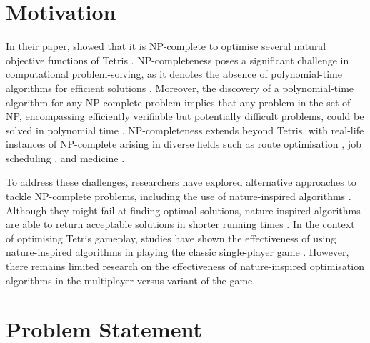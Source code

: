 \documentclass[a4paper, 12pt]{extreport}
\begin{document}
	\section{Motivation}
	
	
	In their paper, \citeauthor{tetris-is-hard-even-to-approx} showed that it is NP-complete to optimise several natural objective functions of Tetris \cite{tetris-is-hard-even-to-approx}. NP-completeness poses a significant challenge in computational problem-solving, as it denotes the absence of polynomial-time algorithms for efficient solutions \cite{sipser-intro-to-computation}. Moreover, the discovery of a polynomial-time algorithm for any NP-complete problem implies that any problem in the set of NP, encompassing efficiently verifiable but potentially difficult problems, could be solved in polynomial time \cite{sipser-intro-to-computation}. NP-completeness extends beyond Tetris, with real-life instances of NP-complete arising in diverse fields such as route optimisation \cite{route-optimisation-np-complete}, job scheduling \cite{job-scheduling-np-complete}, and medicine \cite{medical-diagnosis-np-complete}.
	
	To address these challenges, researchers have explored alternative approaches to tackle NP-complete problems, including the use of nature-inspired algorithms \cite{job-shop-ga}. Although they might fail at finding optimal solutions, nature-inspired algorithms are able to return acceptable solutions in shorter running times \cite{review-nia-wael}. In the context of optimising Tetris gameplay, studies have shown the effectiveness of using nature-inspired algorithms in playing the classic single-player game \cite{tetris-ga-lewis} \cite{swarm-tetris}. However, there remains limited research on the effectiveness of nature-inspired optimisation algorithms in the multiplayer versus variant of the game.
	
	\section{Problem Statement}
	
\end{document}
